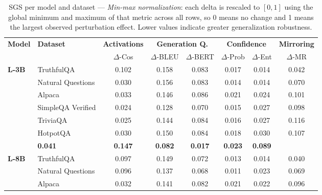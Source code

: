 \begin{table}[ht]
    \centering
    \tiny
    \caption{SGS per model and dataset --- \textit{Min-max normalization}: each delta is rescaled to $[0,1]$ using the global minimum and maximum of that metric across all rows, so 0 means no change and 1 means the largest observed perturbation effect. Lower values indicate greater generalization robustness.}
    \label{tab:sgs_minmax}
    \setlength{\tabcolsep}{3pt}
    \renewcommand{\arraystretch}{1.1}
    \begin{tabular}{ll cccccc}
        \toprule
        \textbf{Model} & \textbf{Dataset} & \textbf{Activations} & \multicolumn{2}{c}{\textbf{Generation Q.}} & \multicolumn{2}{c}{\textbf{Confidence}} & \textbf{Mirroring} \\
        \cmidrule(lr){3-3} \cmidrule(lr){4-5} \cmidrule(lr){6-7} \cmidrule(lr){8-8}
        & & $\Delta$-Cos & $\Delta$-BLEU & $\Delta$-BERT & $\Delta$-Prob & $\Delta$-Ent & $\Delta$-MR \\
        \midrule
        \multirow{6}{*}{\textbf{L-3B}}
        & TruthfulQA \cite{lin2022truthfulqa} & 0.102 & 0.158 & 0.083 & 0.017 & 0.014 & 0.042 \\
        & Natural Questions \cite{kwiatkowski2019natural} & 0.030 & 0.156 & 0.083 & 0.014 & 0.014 & 0.070 \\
        & Alpaca \cite{taori2023stanford-alpaca} & 0.033 & 0.146 & 0.086 & 0.021 & 0.024 & 0.101 \\
        & SimpleQA Verified \cite{haas_simpleqa_2026} & 0.024 & 0.128 & 0.070 & 0.015 & 0.027 & 0.098 \\
        & TriviaQA \cite{joshi2017triviaqa} & 0.025 & 0.144 & 0.084 & 0.016 & 0.027 & 0.116 \\
        & HotpotQA \cite{yang2018hotpotqa} & 0.030 & 0.150 & 0.084 & 0.018 & 0.030 & 0.107 \\
        \rowcolor[gray]{.95} \multicolumn{2}{r}{\textbf{Total SGS}} & \textbf{0.041} & \textbf{0.147} & \textbf{0.082} & \textbf{0.017} & \textbf{0.023} & \textbf{0.089} \\
        \midrule
        \multirow{6}{*}{\textbf{L-8B}}
        & TruthfulQA \cite{lin2022truthfulqa} & 0.097 & 0.149 & 0.072 & 0.013 & 0.014 & 0.040 \\
        & Natural Questions \cite{kwiatkowski2019natural} & 0.096 & 0.137 & 0.068 & 0.011 & 0.023 & 0.069 \\
        & Alpaca \cite{taori2023stanford-alpaca} & 0.032 & 0.141 & 0.082 & 0.021 & 0.022 & 0.096 \\

\end{tabular}
\end{table}
